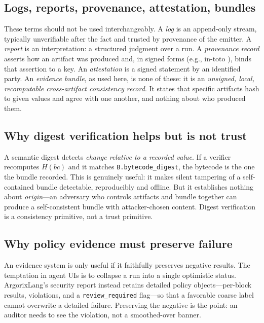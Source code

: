 \documentclass[conference]{IEEEtran}
\newcommand{\code}[1]{\texttt{\small #1}}
\newcommand{\Argorix}{%
\textcolor{argViolet}{A}\textcolor{argViolet}{r}\textcolor{argIndigo}{g}\textcolor{argIndigo}{o}\textcolor{argElectric}{r}\textcolor{argElectric}{i}\textcolor{argElectric}{x}\textcolor{argCyan}{L}\textcolor{argCyan}{a}\textcolor{argCyanBright}{n}\textcolor{argCyanBright}{g}\xspace}
\begin{document}
\subsection{Logs, reports, provenance, attestation, bundles}
These terms should not be used interchangeably. A \emph{log} is an append-only stream,
typically unverifiable after the fact and trusted by provenance of the emitter. A
\emph{report} is an interpretation: a structured judgment over a run. A \emph{provenance
record} asserts how an artifact was produced and, in signed forms (e.g., in-toto
\cite{torresarias2019intoto}), binds that assertion to a key. An \emph{attestation} is a
signed statement by an identified party. An \emph{evidence bundle}, as used here, is none
of these: it is an \emph{unsigned, local, recomputable cross-artifact consistency
record}. It states that specific artifacts hash to given values and agree with one
another, and nothing about who produced them.

\subsection{Why digest verification helps but is not trust}
A semantic digest detects \emph{change relative to a recorded value}. If a verifier
recomputes $H(bc)$ and it matches \code{B.bytecode\_digest}, the bytecode is the one the
bundle recorded. This is genuinely useful: it makes silent tampering of a self-contained
bundle detectable, reproducibly and offline. But it establishes nothing about
\emph{origin}---an adversary who controls artifacts and bundle together can produce a
self-consistent bundle with attacker-chosen content. Digest verification is a
consistency primitive, not a trust primitive.

\subsection{Why policy evidence must preserve failure}
An evidence system is only useful if it faithfully preserves negative results. The
temptation in agent UIs is to collapse a run into a single optimistic status. \Argorix's
security report instead retains detailed policy objects---per-block results, violations,
and a \code{review\_required} flag---so that a favorable coarse label cannot overwrite a
detailed failure. Preserving the negative is the point: an auditor needs to see the
violation, not a smoothed-over banner.
\end{document}
